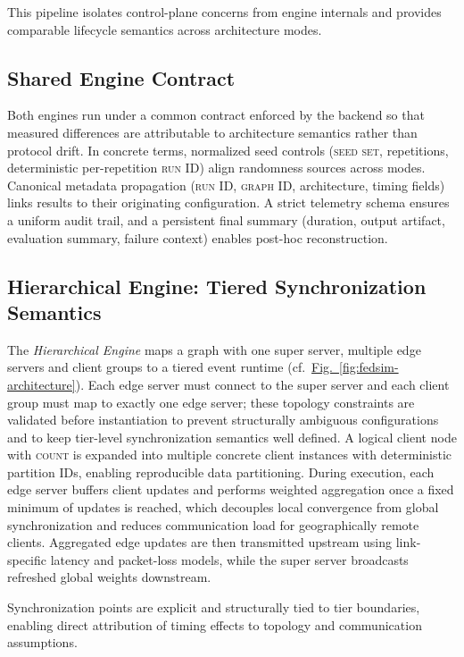 \documentclass[conference]{IEEEtran}
\newcommand{\figref}[1]{\hyperref[#1]{Fig.~\ref*{#1}}}
\begin{document}
This pipeline isolates control-plane concerns from engine internals and provides comparable lifecycle semantics across architecture modes.

\subsection{Shared Engine Contract}
Both engines run under a common contract enforced by the backend so that measured differences are attributable to architecture semantics rather than protocol drift. In concrete terms, normalized seed controls (\textsc{seed set}, repetitions, deterministic per-repetition \textsc{run ID}) align randomness sources across modes. Canonical metadata propagation (\textsc{run ID}, \textsc{graph ID}, architecture, timing fields) links results to their originating configuration. A strict telemetry schema ensures a uniform audit trail, and a persistent final summary (duration, output artifact, evaluation summary, failure context) enables post-hoc reconstruction.

\subsection{Hierarchical Engine: Tiered Synchronization Semantics}
The \textit{Hierarchical Engine} maps a graph with one super server, multiple edge servers and client groups to a tiered event runtime (cf.\ \figref{fig:fedsim-architecture}). Each edge server must connect to the super server and each client group must map to exactly one edge server; these topology constraints are validated before instantiation to prevent structurally ambiguous configurations and to keep tier-level synchronization semantics well defined. A logical client node with \textsc{count} is expanded into multiple concrete client instances with deterministic partition IDs, enabling reproducible data partitioning. During execution, each edge server buffers client updates and performs weighted aggregation once a fixed minimum of updates is reached, which decouples local convergence from global synchronization and reduces communication load for geographically remote clients. Aggregated edge updates are then transmitted upstream using link-specific latency and packet-loss models, while the super server broadcasts refreshed global weights downstream.

Synchronization points are explicit and structurally tied to tier boundaries, enabling direct attribution of timing effects to topology and communication assumptions.
\end{document}
